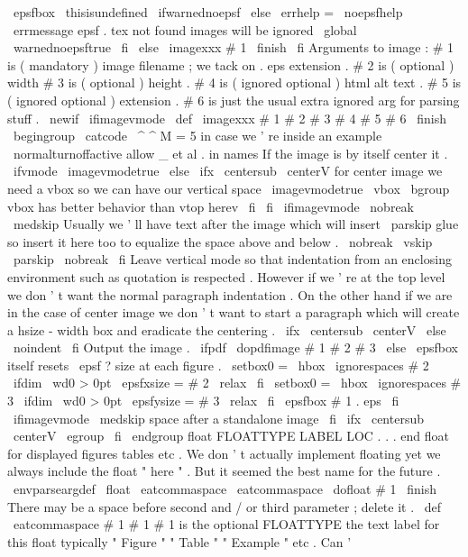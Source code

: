 {{{{{\
epsfbox
\
thisisundefined
\
ifwarnednoepsf
\
else
\
errhelp
=
\
noepsfhelp
\
errmessage
{
epsf
.
tex
not
found
images
will
be
ignored
}
%
\
global
\
warnednoepsftrue
\
fi
\
else
\
imagexxx
#
1
\
finish
\
fi
}
%
%
Arguments
to
image
:
%
#
1
is
(
mandatory
)
image
filename
;
we
tack
on
.
eps
extension
.
%
#
2
is
(
optional
)
width
#
3
is
(
optional
)
height
.
%
#
4
is
(
ignored
optional
)
html
alt
text
.
%
#
5
is
(
ignored
optional
)
extension
.
%
#
6
is
just
the
usual
extra
ignored
arg
for
parsing
stuff
.
\
newif
\
ifimagevmode
\
def
\
imagexxx
#
1
#
2
#
3
#
4
#
5
#
6
\
finish
{
\
begingroup
\
catcode
\
^
^
M
=
5
%
in
case
we
'
re
inside
an
example
\
normalturnoffactive
%
allow
_
et
al
.
in
names
%
If
the
image
is
by
itself
center
it
.
\
ifvmode
\
imagevmodetrue
\
else
\
ifx
\
centersub
\
centerV
%
for
center
image
we
need
a
vbox
so
we
can
have
our
vertical
space
\
imagevmodetrue
\
vbox
\
bgroup
%
vbox
has
better
behavior
than
vtop
herev
\
fi
\
fi
%
\
ifimagevmode
\
nobreak
\
medskip
%
Usually
we
'
ll
have
text
after
the
image
which
will
insert
%
\
parskip
glue
so
insert
it
here
too
to
equalize
the
space
%
above
and
below
.
\
nobreak
\
vskip
\
parskip
\
nobreak
\
fi
%
%
Leave
vertical
mode
so
that
indentation
from
an
enclosing
%
environment
such
as
quotation
is
respected
.
%
However
if
we
'
re
at
the
top
level
we
don
'
t
want
the
%
normal
paragraph
indentation
.
%
On
the
other
hand
if
we
are
in
the
case
of
center
image
we
don
'
t
%
want
to
start
a
paragraph
which
will
create
a
hsize
-
width
box
and
%
eradicate
the
centering
.
\
ifx
\
centersub
\
centerV
\
else
\
noindent
\
fi
%
%
Output
the
image
.
\
ifpdf
\
dopdfimage
{
#
1
}
{
#
2
}
{
#
3
}
%
\
else
%
\
epsfbox
itself
resets
\
epsf
?
size
at
each
figure
.
\
setbox0
=
\
hbox
{
\
ignorespaces
#
2
}
\
ifdim
\
wd0
>
0pt
\
epsfxsize
=
#
2
\
relax
\
fi
\
setbox0
=
\
hbox
{
\
ignorespaces
#
3
}
\
ifdim
\
wd0
>
0pt
\
epsfysize
=
#
3
\
relax
\
fi
\
epsfbox
{
#
1
.
eps
}
%
\
fi
%
\
ifimagevmode
\
medskip
%
space
after
a
standalone
image
\
fi
\
ifx
\
centersub
\
centerV
\
egroup
\
fi
\
endgroup
}
%
float
FLOATTYPE
LABEL
LOC
.
.
.
end
float
for
displayed
figures
tables
%
etc
.
We
don
'
t
actually
implement
floating
yet
we
always
include
the
%
float
"
here
"
.
But
it
seemed
the
best
name
for
the
future
.
%
\
envparseargdef
\
float
{
\
eatcommaspace
\
eatcommaspace
\
dofloat
#
1
\
finish
}
%
There
may
be
a
space
before
second
and
/
or
third
parameter
;
delete
it
.
\
def
\
eatcommaspace
#
1
{
#
1
}
%
#
1
is
the
optional
FLOATTYPE
the
text
label
for
this
float
typically
%
"
Figure
"
"
Table
"
"
Example
"
etc
.
Can
'
}}}}
